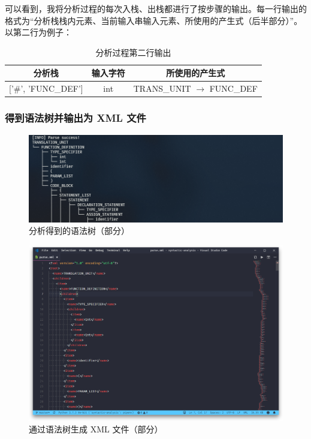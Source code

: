 \documentclass[UTF8]{ctexart}
\begin{document}
可以看到，我将分析过程的每次入栈、出栈都进行了按步骤的输出。每一行输出的格式为“分析栈栈内元素、当前输入串输入元素、所使用的产生式（后半部分）”。以第二行为例子：

\begin{table}[H]
  \centering
  \caption{分析过程第二行输出}
  \label{tab:parseoutput}
  \begin{tabular}{@{}c|c|c@{}}
  \toprule
  分析栈 & 输入字符 & 所使用的产生式 \\ \midrule
  {[}'\#', 'FUNC\_DEF'{]} & int & TRANS\_UNIT $\rightarrow$ FUNC\_DEF \\ \bottomrule
  \end{tabular}
\end{table}

\subsubsection{得到语法树并输出为 XML 文件}
\begin{figure}[h]
  \includegraphics[width=\linewidth]{images/parsetree.png}
  \caption{分析得到的语法树（部分）}
  \label{fig:figure7}
\end{figure}

\begin{figure}[h]
  \includegraphics[width=\linewidth]{images/xml.png}
  \caption{通过语法树生成 XML 文件（部分）}
  \label{fig:figure8}
\end{figure}
\end{document}
